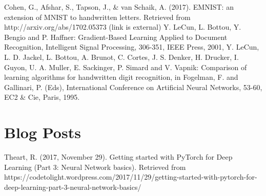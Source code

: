 \documentclass[letterpaper, 10 pt, conference]{ieeeconf}  %
\begin{document}
\pagebreak
\begin{thebibliography}{99}
 Cohen, G., Afshar, S., Tapson, J., \& van Schaik, A. (2017). EMNIST: an extension of MNIST to handwritten letters. Retrieved from http://arxiv.org/abs/1702.05373 (link is external)
 Y. LeCun, L. Bottou, Y. Bengio and P. Haffner: Gradient-Based Learning Applied to Document Recognition, Intelligent Signal Processing, 306-351, IEEE Press, 2001,
 Y. LeCun, L. D. Jackel, L. Bottou, A. Brunot, C. Cortes, J. S. Denker, H. Drucker, I. Guyon, U. A. Muller, E. Sackinger, P. Simard and V. Vapnik: Comparison of learning algorithms for handwritten digit recognition, in Fogelman, F. and Gallinari, P. (Eds), International Conference on Artificial Neural Networks, 53-60, EC2 \& Cie, Paris, 1995.


\section*{Blog Posts}

 Theart, R. (2017, November 29). Getting started with PyTorch for Deep Learning (Part 3: Neural Network basics). Retrieved from https://codetolight.wordpress.com/2017/11/29/getting-started-with-pytorch-for-deep-learning-part-3-neural-network-basics/

\end{thebibliography}
\end{document}
